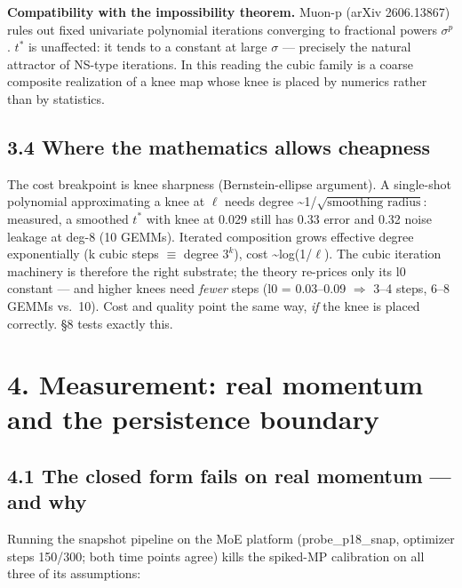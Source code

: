 \documentclass[
]{article}
\begin{document}
\textbf{Compatibility with the impossibility theorem.} Muon-p (arXiv
2606.13867) rules out fixed univariate polynomial iterations converging
to fractional powers \(\sigma^p\). \(t^*\) is unaffected: it tends to a
constant at large \(\sigma\) --- precisely the natural attractor of
NS-type iterations. In this reading the cubic family is a coarse
composite realization of a knee map whose knee is placed by numerics
rather than by statistics.

\subsection{3.4 Where the mathematics allows
cheapness}\label{where-the-mathematics-allows-cheapness}

The cost breakpoint is knee sharpness (Bernstein-ellipse argument). A
single-shot polynomial approximating a knee at \(\ell\) needs degree
\textasciitilde1/\(\sqrt{\text{smoothing radius}}\): measured, a
smoothed \(t^*\) with knee at 0.029 still has 0.33 error and 0.32 noise
leakage at deg-8 (10 GEMMs). Iterated composition grows effective degree
exponentially (k cubic steps \(\equiv\) degree \(3^k\)), cost
\textasciitilde log(1/\(\ell\)). The cubic iteration machinery is
therefore the right substrate; the theory re-prices only its l0 constant
--- and higher knees need \emph{fewer} steps (l0 = 0.03--0.09
\(\Rightarrow\) 3--4 steps, 6--8 GEMMs vs.~10). Cost and quality point
the same way, \emph{if} the knee is placed correctly. §8 tests exactly
this.

\section{4. Measurement: real momentum and the persistence
boundary}\label{measurement-real-momentum-and-the-persistence-boundary}

\subsection{4.1 The closed form fails on real momentum --- and
why}\label{the-closed-form-fails-on-real-momentum-and-why}

Running the snapshot pipeline on the MoE platform (probe\_p18\_snap,
optimizer steps 150/300; both time points agree) kills the spiked-MP
calibration on all three of its assumptions:
\end{document}
